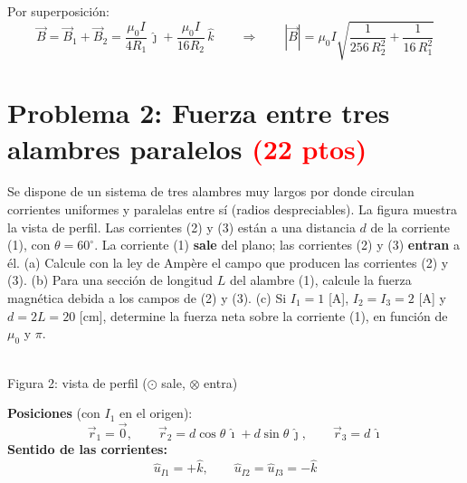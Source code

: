 \documentclass[12pt,letterpaper]{article}
\newcommand{\punto}[2][black]{%
  \draw[#1,line width=0.8pt,fill=white] (#2) circle (0.22);
  \fill[#1] (#2) circle (0.05);}
\newcommand{\cruz}[2][black]{%
  \draw[#1,line width=0.8pt,fill=white] (#2) circle (0.22);
  \draw[#1,line width=0.8pt] ($(#2)+(-0.155,-0.155)$)--($(#2)+(0.155,0.155)$)
        ($(#2)+(-0.155,0.155)$)--($(#2)+(0.155,-0.155)$);}
\begin{document}
\noindent Por superposici\'on:
\[
    \boxed{\vec{B} = \vec{B}_1 + \vec{B}_2 = \frac{\mu_0 I}{4R_1}\,\hat{\jmath} + \frac{\mu_0 I}{16R_2}\,\hat{k}}
    \qquad\Longrightarrow\qquad
    |\vec{B}| = \mu_0 I\sqrt{\frac{1}{256\,R_2^2} + \frac{1}{16\,R_1^2}}
\]

\newpage
\section*{Problema 2: Fuerza entre tres alambres paralelos \textcolor{red}{(22 ptos)}}

\noindent Se dispone de un sistema de tres alambres muy largos por donde circulan corrientes
uniformes y paralelas entre s\'i (radios despreciables). La figura muestra la vista de perfil. Las
corrientes (2) y (3) est\'an a una distancia $d$ de la corriente (1), con $\theta = 60^\circ$. La
corriente (1) \textbf{sale} del plano; las corrientes (2) y (3) \textbf{entran} a \'el.
(a) Calcule con la ley de Amp\`ere el campo que producen las corrientes (2) y (3). (b) Para una
secci\'on de longitud $L$ del alambre (1), calcule la fuerza magn\'etica debida a los campos de (2)
y (3). (c) Si $I_1 = 1$ [A], $I_2 = I_3 = 2$ [A] y $d = 2L = 20$ [cm], determine la fuerza neta sobre
la corriente (1), en funci\'on de $\mu_0$ y $\pi$.

\medskip

\noindent
\begin{minipage}[c]{0.42\textwidth}
\centering
{}\\[2pt]
{\footnotesize Figura 2: vista de perfil ($\odot$ sale, $\otimes$ entra)}
\end{minipage}%
\hfill
\begin{minipage}[c]{0.54\textwidth}
\textbf{Posiciones} (con $I_1$ en el origen):
\[
    \vec{r}_1 = \vec{0},\qquad
    \vec{r}_2 = d\cos\theta\,\hat{\imath} + d\sin\theta\,\hat{\jmath},\qquad
    \vec{r}_3 = d\,\hat{\imath}
\]
\textbf{Sentido de las corrientes:}
\[
    \hat{u}_{I1} = +\hat{k},\qquad \hat{u}_{I2} = \hat{u}_{I3} = -\hat{k}
\]
\end{minipage}
\end{document}
